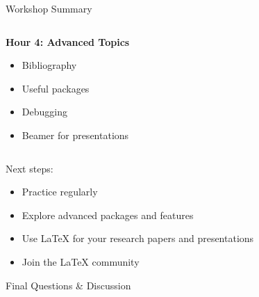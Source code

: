 \begin{frame}{Workshop Summary}
\begin{columns}
\begin{column}{0.5\textwidth}
						\textbf{Hour 4: Advanced Topics}
						\begin{itemize}
							\item Bibliography
							\item Useful packages
							\item Debugging
							\item Beamer for presentations
						\end{itemize}
					\end{column}
				\end{columns}
				
				\begin{alertblock}{Next steps:}
					\begin{itemize}
						\item Practice regularly
						\item Explore advanced packages and features
						\item Use LaTeX for your research papers and presentations
						\item Join the LaTeX community
					\end{itemize}
				\end{alertblock}
			\end{frame}
			
			\begin{frame}{Final Questions \& Discussion}
				\begin{center}
				\end{center}
			\end{frame}
